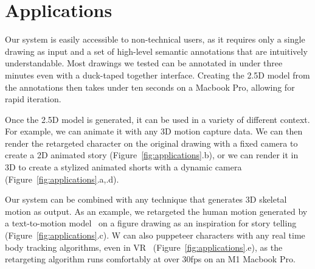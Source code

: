
\section{Applications}
Our system is easily accessible to non-technical users, as it requires only a single drawing as input and a set of high-level semantic annotations that are intuitively understandable. Most drawings we tested can be annotated in under three minutes even with a duck-taped together interface. Creating the 2.5D model from the annotations then takes under ten seconds on a Macbook Pro, allowing for rapid iteration.

Once the 2.5D model is generated, it can be used in a variety of different context. For example, we can animate it with any 3D motion capture data. We can then render the retargeted character on the original drawing with a fixed camera to create a 2D animated story (Figure~\ref{fig:applications}.b), or we can render it in 3D to create a stylized animated shorts with a dynamic camera (Figure~\ref{fig:applications}.a,.d). 

Our system can be combined with any technique that generates 3D skeletal motion as output. As an example, we retargeted the human motion generated by a text-to-motion model~\cite{Qian_2023_ICCV} on a figure drawing as an inspiration for story telling (Figure~\ref{fig:applications}.c). W can also puppeteer characters with any real time body tracking algorithms, even in VR~\cite{10.1145/3550469.3555411} (Figure~\ref{fig:applications}.e), as the retargeting algorithm runs comfortably at over 30fps on an M1 Macbook Pro.


